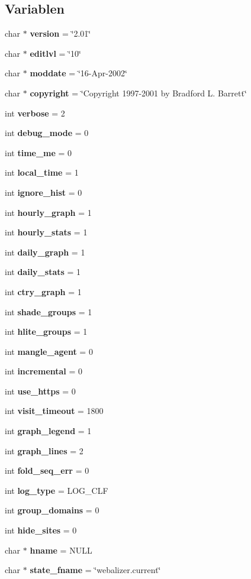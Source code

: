 \subsection*{Variablen}
\begin{CompactItemize}
\item 
char $\ast$ {\bf version} = \char`\"{}2.01\char`\"{}
\item 
char $\ast$ {\bf editlvl} = \char`\"{}10\char`\"{}
\item 
char $\ast$ {\bf moddate} = \char`\"{}16-Apr-2002\char`\"{}
\item 
char $\ast$ {\bf copyright} = \char`\"{}Copyright 1997-2001 by Bradford L. Barrett\char`\"{}
\item 
int {\bf verbose} = 2
\item 
int {\bf debug\_\-mode} = 0
\item 
int {\bf time\_\-me} = 0
\item 
int {\bf local\_\-time} = 1
\item 
int {\bf ignore\_\-hist} = 0
\item 
int {\bf hourly\_\-graph} = 1
\item 
int {\bf hourly\_\-stats} = 1
\item 
int {\bf daily\_\-graph} = 1
\item 
int {\bf daily\_\-stats} = 1
\item 
int {\bf ctry\_\-graph} = 1
\item 
int {\bf shade\_\-groups} = 1
\item 
int {\bf hlite\_\-groups} = 1
\item 
int {\bf mangle\_\-agent} = 0
\item 
int {\bf incremental} = 0
\item 
int {\bf use\_\-https} = 0
\item 
int {\bf visit\_\-timeout} = 1800
\item 
int {\bf graph\_\-legend} = 1
\item 
int {\bf graph\_\-lines} = 2
\item 
int {\bf fold\_\-seq\_\-err} = 0
\item 
int {\bf log\_\-type} = LOG\_\-CLF
\item 
int {\bf group\_\-domains} = 0
\item 
int {\bf hide\_\-sites} = 0
\item 
char $\ast$ {\bf hname} = NULL
\item 
char $\ast$ {\bf state\_\-fname} = \char`\"{}webalizer.current\char`\"{}
\item 

\end{CompactItemize}
